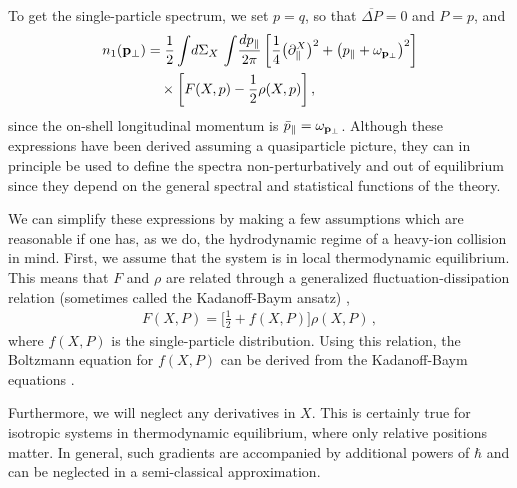 \documentclass[reprint,superscriptaddress,english,preprintnumbers,amsmath,amssymb,aps,prx]{revtex4-2}
\begin{document}
To get the single-particle spectrum, we set $p = q$, so that $\overline{\Delta P} = 0$ and $P = p$, and
\begin{align}\label{eq:ss}
\begin{split}
n_1(\bold{p}_\perp)&= \frac{1}{2}\int\!d\Sigma_X\,\int\! \frac{dp_\parallel}{2\pi}\, \bigg[ 
\frac{1}{4}\big(\partial_{\parallel}^X\big)^2 +\big( p_\parallel + \omega_{\bold{p}_\perp} \big)^2  \bigg]\\
&\quad\times\bigg[ F(X,p) - \frac{1}{2}\rho(X,p) \bigg]\,,
\end{split}
\end{align}
since the on-shell longitudinal momentum is $\bar p_\parallel = \omega_{\bold{p}_\perp}$.
Although these expressions have been derived assuming a quasiparticle picture, they can in principle be used to define the spectra non-perturbatively and out of equilibrium since they depend on the general spectral and statistical functions of the theory.


We can simplify these expressions by making a few assumptions which are reasonable if one has, as we do, the hydrodynamic regime of a heavy-ion collision in mind. First, we assume that the system is in local thermodynamic equilibrium. This means that $F$ and $\rho$ are related through a generalized fluctuation-dissipation relation (sometimes called the Kadanoff-Baym ansatz) \cite{Kadanoff2018QuantumSM},
\begin{align}
F(X,P) = \bigg[ \frac{1}{2} + f(X,P) \bigg] \rho(X,P)\,,
\end{align}
where $f(X,P)$ is the single-particle distribution. Using this relation, the Boltzmann equation for $f(X,P)$ can be derived from the Kadanoff-Baym equations \cite{Berges:2004yj}. 

Furthermore, we will neglect any derivatives in $X$. This is certainly true for isotropic systems in thermodynamic equilibrium, where only relative positions matter. In general, such gradients are accompanied by additional powers of $\hbar$ and can be neglected in a semi-classical approximation.
\end{document}
